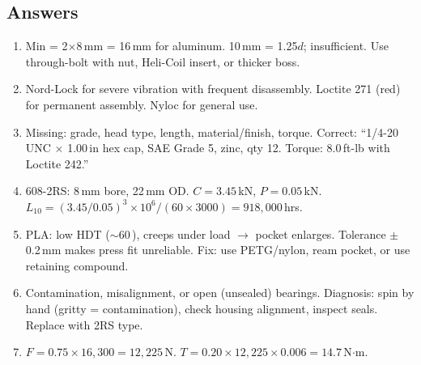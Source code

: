 \subsection{Answers}
\begin{enumerate}[leftmargin=1.5em]
\item Min = 2$\times$8\,mm = 16\,mm for aluminum. 10\,mm = 1.25$d$; insufficient. Use through-bolt with nut, Heli-Coil insert, or thicker boss.
\item Nord-Lock for severe vibration with frequent disassembly. Loctite 271 (red) for permanent assembly. Nyloc for general use.
\item Missing: grade, head type, length, material/finish, torque. Correct: ``1/4-20 UNC $\times$ 1.00\,in hex cap, SAE Grade 5, zinc, qty 12. Torque: 8.0\,ft-lb with Loctite 242.''
\item 608-2RS: 8\,mm bore, 22\,mm OD. $C = 3.45$\,kN, $P = 0.05$\,kN. $L_{10} = (3.45/0.05)^3 \times 10^6/(60 \times 3000) = 918{,}000$\,hrs.
\item PLA: low HDT ($\sim$60\,\degC{}), creeps under load $\to$ pocket enlarges. Tolerance $\pm$0.2\,mm makes press fit unreliable. Fix: use PETG/nylon, ream pocket, or use retaining compound.
\item Contamination, misalignment, or open (unsealed) bearings. Diagnosis: spin by hand (gritty = contamination), check housing alignment, inspect seals. Replace with 2RS type.
\item $F = 0.75 \times 16{,}300 = 12{,}225$\,N. $T = 0.20 \times 12{,}225 \times 0.006 = 14.7$\,N$\cdot$m.
\end{enumerate}


